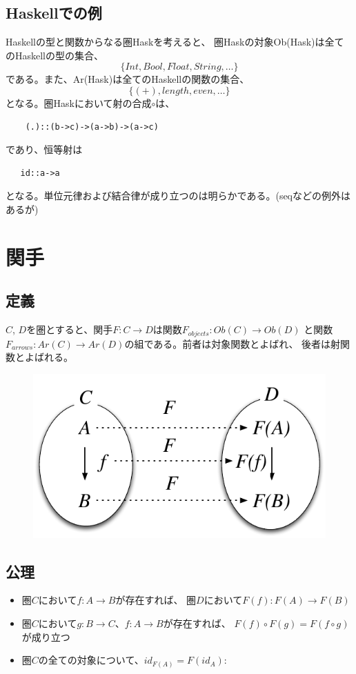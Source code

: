 \documentclass{jsarticle}
\begin{document}
\subsection{Haskellでの例}
Haskellの型と関数からなる圏Haskを考えると、
圏Haskの対象Ob(Hask)は全てのHaskellの型の集合、
\[\{Int, Bool, Float, String, \ldots\}\]
である。また、Ar(Hask)は全てのHaskellの関数の集合、
\[\{(+), length, even, \ldots\}\]
となる。圏Haskにおいて射の合成$\circ$は、
\begin{lstlisting}
    (.)::(b->c)->(a->b)->(a->c)
\end{lstlisting}
であり、恒等射は
\begin{lstlisting}
   id::a->a
\end{lstlisting}
となる。単位元律および結合律が成り立つのは明らかである。(seqなどの例外はあるが)

\newpage
\section{関手}

\subsection{定義}
$C$, $D$を圏とすると、関手$F:C \to D$は関数$F_{objects}:Ob(C) \to Ob(D)$
と関数$F_{arrows}:Ar(C)\to Ar(D)$の組である。前者は対象関数とよばれ、
後者は射関数とよばれる。

\begin{figure}[htbp]
    \centering
    \includegraphics{diag_functor.pdf} 
\end{figure}

\subsection{公理}
\begin{itemize}
    \item 圏$C$において$f:A\to B$が存在すれば、
        圏$D$において$F(f):F(A)\to F(B)$
    \item 圏$C$において$g:B\to C$、$f:A\to B$が存在すれば、
        $F(f)\circ F(g)=F(f\circ g)$が成り立つ
    \item 圏$C$の全ての対象について、$id_{F(A)}=F(id_A)$:
\end{itemize}
\end{document}

